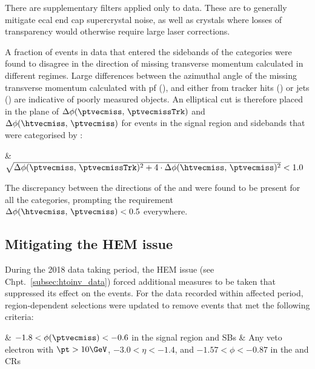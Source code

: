 \medskip

\noindent{}There are supplementary filters applied only to data. These are to generally mitigate \acrshort{ecal} end cap supercrystal noise, as well as crystals where losses of transparency would otherwise require large laser corrections.

A fraction of events in data that entered the sidebands of the \ttH categories were found to disagree in the direction of missing transverse momentum calculated in different regimes. Large differences between the azimuthal angle of the missing transverse momentum calculated with \acrlong{pf} (\ptvecmiss), and either from tracker hits (\ptvecmissTrk) or \glspl{jet} (\htvecmiss) are indicative of poorly measured objects. An elliptical cut is therefore placed in the plane of $\Delta\phi(\ptvecmiss, \, \ptvecmissTrk)$ and $\Delta\phi(\htvecmiss, \, \ptvecmiss)$ for events in the signal region and sidebands that were categorised by \ttH:

\medskip

\begin{easylist}[itemize]
    \cutflowlistprops
    & $\sqrt{ \Delta\phi(\ptvecmiss, \, \ptvecmissTrk)^2 + \text{4} \cdot \Delta\phi(\htvecmiss, \, \ptvecmiss)^2 } < \text{1.0}$
\end{easylist}

The discrepancy between the directions of the \htvecmiss and \ptvecmiss were found to be present for all the categories, prompting the requirement $\Delta\phi(\htvecmiss, \, \ptvecmiss) < \text{0.5}$ everywhere.




\subsection{Mitigating the HEM issue}
\label{subsec:htoinv_hem_mitigation}

During the 2018 data taking period, the HEM issue (see Chpt.~\ref{subsec:htoinv_data}) forced additional measures to be taken that suppressed its effect on the events. For the data recorded within affected period, region-dependent selections were updated to remove events that met the following criteria:
\medskip
\begin{easylist}[itemize]
    \cutflowlistprops
    & $-\text{1.8} < \phi(\ptvecmiss) < -\text{0.6}$ in the signal region and \glspl{SB}
    & Any veto electron \vetoEle with $\pt > \text{10}\GeV$, $-\text{3.0} < \eta < -\text{1.4}$, and $-\text{1.57} < \phi < -\text{0.87}$ in the \singleEleCr and \doubleEleCr \glspl{CR}
\end{easylist}

